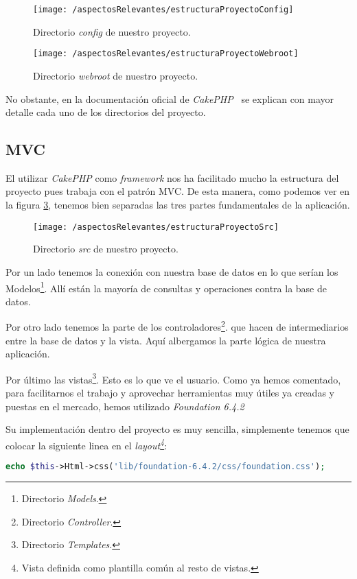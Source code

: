 \begin{figure}[ht]
	\centering
	\texttt{[image: /aspectosRelevantes/estructuraProyectoConfig]}
	\caption{Directorio \textit{config} de nuestro proyecto.}
	\label{fig:estructuraProyectoConfig}
\end{figure}

\begin{figure}[ht]
	\centering
	\texttt{[image: /aspectosRelevantes/estructuraProyectoWebroot]}
	\caption{Directorio \textit{webroot} de nuestro proyecto.}
	\label{fig:estructuraProyectoWebroot}
\end{figure}

No obstante, en la documentación oficial de \textit{CakePHP}~\cite{web:estructuraCarpetasCakePHP} se explican con mayor detalle cada uno de los directorios del proyecto.

\subsection{MVC}

El utilizar \textit{CakePHP} como \textit{framework} nos ha facilitado mucho la estructura del proyecto pues trabaja con el patrón MVC. De esta manera, como podemos ver en la figura \ref{fig:estructuraProyectoSrc}, tenemos bien separadas las tres partes fundamentales de la aplicación. 

\begin{figure}[ht]
	\centering
	\texttt{[image: /aspectosRelevantes/estructuraProyectoSrc]}
	\caption{Directorio \textit{src} de nuestro proyecto.}
	\label{fig:estructuraProyectoSrc}
\end{figure}

Por un lado tenemos la conexión con nuestra base de datos en lo que serían los Modelos\footnote{Directorio \textit{Models}.}. Allí están la mayoría de consultas y operaciones contra la base de datos. 

Por otro lado tenemos la parte de los controladores\footnote{Directorio \textit{Controller}.}. que hacen de intermediarios entre la base de datos y la vista. Aquí albergamos la parte lógica de nuestra aplicación.

Por último las vistas\footnote{Directorio \textit{Templates}.}. Esto es lo que ve el usuario. Como ya hemos comentado, para facilitarnos el trabajo y aprovechar herramientas muy útiles ya creadas y puestas en el mercado, hemos utilizado \textit{Foundation 6.4.2}

Su implementación dentro del proyecto es muy sencilla, simplemente tenemos que colocar la siguiente linea en el \textit{layout\footnote{Vista definida como plantilla común al resto de vistas.}}:

\begin{lstlisting}[language=php]
echo $this->Html->css('lib/foundation-6.4.2/css/foundation.css');
\end{lstlisting}